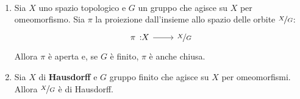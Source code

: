 \begin{proposition}~{}
\begin{enumerate}
\item Sia $X$ uno spazio topologico e $G$ un gruppo che agisce su $X$ per omeomorfismo. Sia $\pi$ la proiezione dall'insieme allo spazio delle orbite $\nicefrac{X}{G}$:
	\begin{equation}
		\funz{\pi}{X}{\nicefrac{X}{G}}
	\end{equation}
Allora $\pi$ è aperta e, se $G$ è finito, $\pi$ è anche chiusa.
\item Sia $X$ di \textbf{Hausdorff} e $G$ gruppo finito che agisce su $X$ per omeomorfismi. Allora $\nicefrac{X}{G}$ è di Hausdorff.
\end{enumerate}
\vspace{-3mm}
\end{proposition}
